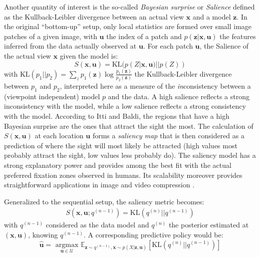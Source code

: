 \documentclass[12pt,twoside,openright]{article}
\begin{document}
Another quantity of interest is the so-called \emph{Bayesian surprise} or \emph{Salience} \citep{itti2005bayesian} defined as the Kullback-Leibler divergence  between an actual view $\boldsymbol{x}$ and a model $\boldsymbol{z}$. In the original ``bottom-up'' setup, only local statistics are formed over small image patches of a given image, with $\boldsymbol{u}$ the index of a patch and $p(\boldsymbol{z}|\boldsymbol{x},\boldsymbol{u})$ the features inferred from the data actually observed at $\boldsymbol{u}$. For each patch $\boldsymbol{u}$, the Salience of the actual view $\boldsymbol{x}$ given the model is:
$$ S(\boldsymbol{x},\boldsymbol{u}) = \text{KL}(p(Z| \boldsymbol{x}, \boldsymbol{u})||p(Z))$$
{\color{Purple} with $\text{KL}(p_1||p_2) = \sum_z p_1(\boldsymbol{z}) \log \frac{p_1(\boldsymbol{z})}{p_2(\boldsymbol{z})}$ the Kullback-Leibler divergence between $p_1$ and $p_2$, interpreted here as} a measure of the \emph{in}consistency between a (viewpoint independent)  model $p$ and the data. A high salience reflects a strong inconsistency with the model, while a low salience reflects a strong consistency with the model. According to Itti and Baldi, the regions that have a high Bayesian surprise are the ones that attract the sight the most. The calculation of $S(\boldsymbol{x}, \boldsymbol{u})$ at each location $\boldsymbol{u}$ forms a \emph{saliency map} that is then considered as a prediction of where the sight will most likely be attracted (high values most probably attract the sight, low values less probably do). The saliency model has a strong explanatory power and provides among the best fit with the actual preferred fixation zones observed in humans.
Its scalability moreover provides straightforward applications in image and video compression  \citep{wang2003foveation,guo2010novel}.

Generalized to the sequential setup, the saliency metric becomes:
\begin{align} S(\boldsymbol{x},\boldsymbol{u}; q^{(n-1)}) = \text{KL}(q^{(n)}||q^{(n-1)})\label{eq:saliency}
\end{align}
with $q^{(n-1)}$ considered as the data model and $q^{(n)}$ the posterior estimated at $(\boldsymbol{x},\boldsymbol{u})$, {\color{Purple} knowing $q^{(n-1)}$}. A corresponding predictive policy would be:
$$ \hat{\boldsymbol{u}} = \underset{\boldsymbol{u} \in \mathcal{U}}{\text{ argmax }} \mathbb{E}_{\boldsymbol{z} \sim q^{(n-1)}, \boldsymbol{x} \sim p(X|\boldsymbol{z}, \boldsymbol{u})}\left[\text{KL}(q^{(n)}||q^{(n-1)})\right]$$
\end{document}
